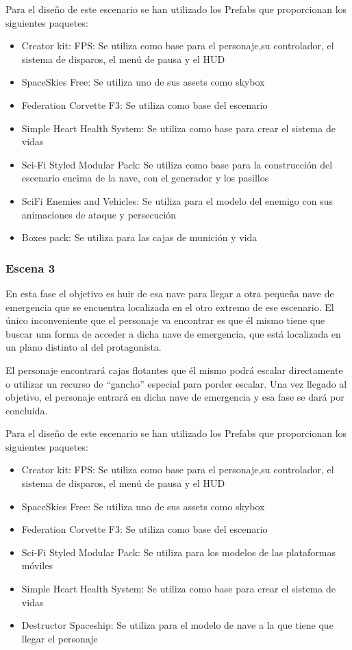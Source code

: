 Para el diseño de este escenario se han utilizado los Prefabs que proporcionan los siguientes paquetes:
\begin{itemize}
	\item Creator kit: FPS: Se utiliza como base para el personaje,su controlador, el sistema de disparos, el menú de pausa y el HUD
	\item SpaceSkies Free: Se utiliza uno de sus assets como skybox
	\item Federation Corvette F3: Se utiliza como base del escenario
	\item Simple Heart Health System: Se utiliza como base para crear el sistema de vidas
	\item Sci-Fi Styled Modular Pack: Se utiliza como base para la construcción del escenario encima de la nave, con el generador y los pasillos
	\item SciFi Enemies and Vehicles: Se utiliza para el modelo del enemigo con sus animaciones de ataque y persecución
	\item Boxes pack: Se utiliza para las cajas de munición y vida
\end{itemize}

\subsubsection{Escena 3}
En esta fase el objetivo es huir de esa nave para llegar a otra pequeña nave de emergencia que se encuentra localizada en el otro extremo de ese escenario. El único inconveniente que el personaje va encontrar es que él mismo tiene que buscar una forma de acceder a dicha nave de emergencia, que está localizada en un plano distinto al del protagonista.

El personaje encontrará cajas flotantes que él mismo podrá escalar directamente o utilizar un recurso de ``gancho'' especial para porder escalar. Una vez llegado al objetivo, el personaje entrará en dicha nave de emergencia y esa fase se dará por concluida.

Para el diseño de este escenario se han utilizado los Prefabs que proporcionan los siguientes paquetes:
\begin{itemize}
	\item Creator kit: FPS: Se utiliza como base para el personaje,su controlador, el sistema de disparos, el menú de pausa y el HUD
	\item SpaceSkies Free: Se utiliza uno de sus assets como skybox
	\item Federation Corvette F3: Se utiliza como base del escenario
	\item Sci-Fi Styled Modular Pack: Se utiliza para los modelos de las plataformas móviles
	\item Simple Heart Health System: Se utiliza como base para crear el sistema de vidas
	\item Destructor Spaceship: Se utiliza para el modelo de nave a la que tiene que llegar el personaje
\end{itemize}

